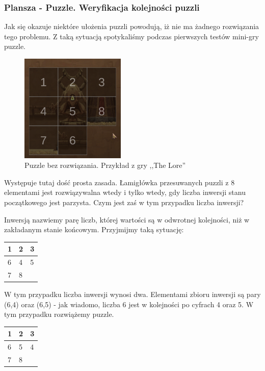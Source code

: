 \documentclass[oneside,polski,logo]{amuthesis}
\begin{document}
\subsubsection{Plansza - Puzzle. Weryfikacja kolejności puzzli}
\par Jak się okazuje niektóre ułożenia puzzli powodują, iż nie ma żadnego rozwiązania tego problemu. Z taką sytuacją spotykaliśmy podczas pierwszych testów mini-gry puzzle. 
\begin{figure}[h]
	\centering
	\includegraphics[width=5cm]{images/tyrek/puzzle_1.png}
	\caption{Puzzle bez rozwiązania. Przykład z gry ,,The Lore''}
\end{figure}

Występuje tutaj dość prosta zasada. Łamigłówka przesuwanych puzzli z 8 elementami jest rozwiązywalna wtedy i tylko wtedy, gdy liczba inwersji stanu początkowego jest parzysta. Czym jest zaś w tym przypadku liczba inwersji?

Inwersją nazwiemy parę liczb, której wartości są w odwrotnej kolejności, niż w zakładanym stanie końcowym. \cite{solvablePuzzle} Przyjmijmy taką sytuację:

\begin{center}
\begin{tabular}{ | m{5em} | m{1cm}| m{1cm} | } 
\hline
 1 & 2 & 3 \\ 
\hline
 6 & 4 & 5 \\
\hline  
 7 & 8 &     \\
\hline
\end{tabular}
\end{center}

W tym przypadku liczba inwersji wynosi dwa. Elementami zbioru inwersji są pary (6,4) oraz (6,5) - jak wiadomo, liczba 6 jest w kolejności po cyfrach 4 oraz 5. W tym przypadku rozwiążemy puzzle.

\begin{center}
\begin{tabular}{ | m{5em} | m{1cm}| m{1cm} | } 
\hline
 1 & 2 & 3 \\ 
\hline
 6 & 5 & 4 \\  
\hline
 7 & 8 &     \\
\hline
\end{tabular}
\end{center}
\end{document}
